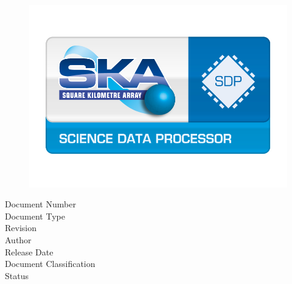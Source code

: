 \thispagestyle{empty}


\setlength{\unitlength}{1mm}


\phantom{test}
\begin{figure}[h]
  \centering
  \includegraphics[width=\textwidth]{science_data_processor_logo.jpg}
\end{figure}


\begin{center}
\fontsize{22}{24}\selectfont \sffamily\bigdoctitle
\end{center}

\vspace{1cm}

\noindent\normalsize{Document Number \dotfill \docnr}\\
\normalsize{Document Type \dotfill \doctype}\\
\normalsize{Revision \dotfill \revision}\\
\normalsize{Author \dotfill \docauthor}\\
\normalsize{Release Date \dotfill \docudate}\\
\normalsize{Document Classification \dotfill \classification}\\
\normalsize{Status \dotfill \docstatus}

\newpage

\begin{center}
\end{center}


